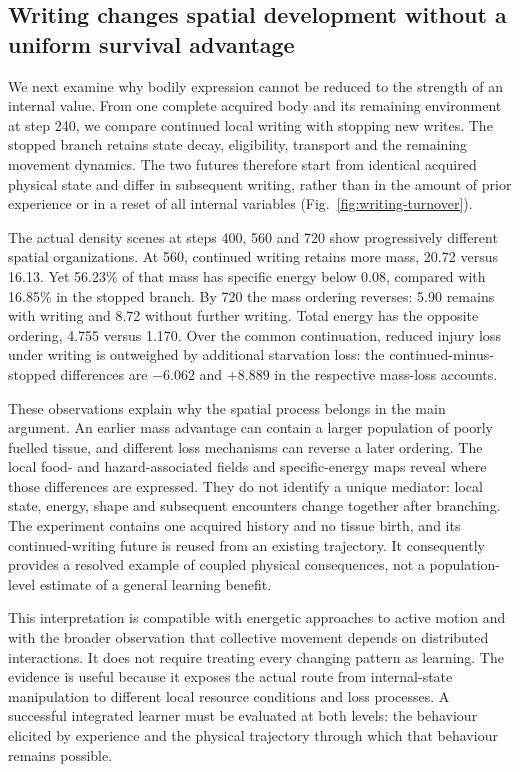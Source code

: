 \subsection*{Writing changes spatial development without a uniform survival advantage}

We next examine why bodily expression cannot be reduced to the strength of an internal value. From one complete acquired body and its remaining environment at step 240, we compare continued local writing with stopping new writes. The stopped branch retains state decay, eligibility, transport and the remaining movement dynamics. The two futures therefore start from identical acquired physical state and differ in subsequent writing, rather than in the amount of prior experience or in a reset of all internal variables (Fig.~\ref{fig:writing-turnover}).

The actual density scenes at steps 400, 560 and 720 show progressively different spatial organizations. At 560, continued writing retains more mass, 20.72 versus 16.13. Yet 56.23\% of that mass has specific energy below $0.08$, compared with 16.85\% in the stopped branch. By 720 the mass ordering reverses: 5.90 remains with writing and 8.72 without further writing. Total energy has the opposite ordering, 4.755 versus 1.170. Over the common continuation, reduced injury loss under writing is outweighed by additional starvation loss: the continued-minus-stopped differences are $-6.062$ and $+8.889$ in the respective mass-loss accounts.



These observations explain why the spatial process belongs in the main argument. An earlier mass advantage can contain a larger population of poorly fuelled tissue, and different loss mechanisms can reverse a later ordering. The local food- and hazard-associated fields and specific-energy maps reveal where those differences are expressed. They do not identify a unique mediator: local state, energy, shape and subsequent encounters change together after branching. The experiment contains one acquired history and no tissue birth, and its continued-writing future is reused from an existing trajectory. It consequently provides a resolved example of coupled physical consequences, not a population-level estimate of a general learning benefit.

This interpretation is compatible with energetic approaches to active motion\cite{schweitzer,circle,tjhung} and with the broader observation that collective movement depends on distributed interactions\cite{tonertu}. It does not require treating every changing pattern as learning. The evidence is useful because it exposes the actual route from internal-state manipulation to different local resource conditions and loss processes. A successful integrated learner must be evaluated at both levels: the behaviour elicited by experience and the physical trajectory through which that behaviour remains possible.
